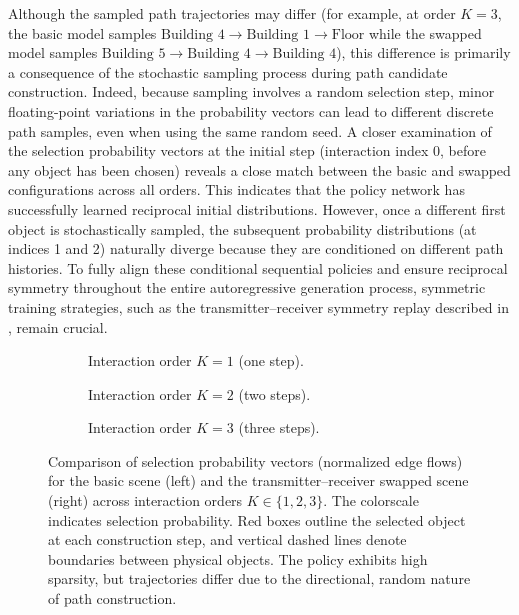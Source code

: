 Although the sampled path trajectories may differ (for example, at order $K=3$, the basic model samples $\text{Building } 4 \rightarrow \text{Building } 1 \rightarrow \text{Floor}$ while the swapped model samples $\text{Building } 5 \rightarrow \text{Building } 4 \rightarrow \text{Building } 4$), this difference is primarily a consequence of the stochastic sampling process during path candidate construction. Indeed, because sampling involves a random selection step, minor floating-point variations in the probability vectors can lead to different discrete path samples, even when using the same random seed. A closer examination of the selection probability vectors at the initial step (interaction index 0, before any object has been chosen) reveals a close match between the basic and swapped configurations across all orders. This indicates that the policy network has successfully learned reciprocal initial distributions. However, once a different first object is stochastically sampled, the subsequent probability distributions (at indices 1 and 2) naturally diverge because they are conditioned on different path histories. To fully align these conditional sequential policies and ensure reciprocal symmetry throughout the entire autoregressive generation process, symmetric training strategies, such as the transmitter--receiver symmetry replay described in , remain crucial.

\begin{figure}
  \centering
  \begin{subfigure}[b]{\contentwidth}
    \centering
    \caption{Interaction order $K=1$ (one step).}
  \end{subfigure}

  \begin{subfigure}[b]{\contentwidth}
    \centering
    \caption{Interaction order $K=2$ (two steps).}
  \end{subfigure}

  \begin{subfigure}[b]{\contentwidth}
    \centering
    \caption{Interaction order $K=3$ (three steps).}
  \end{subfigure}
  \caption{Comparison of selection probability vectors (normalized edge flows) for the basic scene (left) and the transmitter--receiver swapped scene (right) across interaction orders $K \in \{1, 2, 3\}$. The colorscale indicates selection probability. Red boxes outline the selected object at each construction step, and vertical dashed lines denote boundaries between physical objects. The policy exhibits high sparsity, but trajectories differ due to the directional, random nature of path construction.}
\end{figure}


